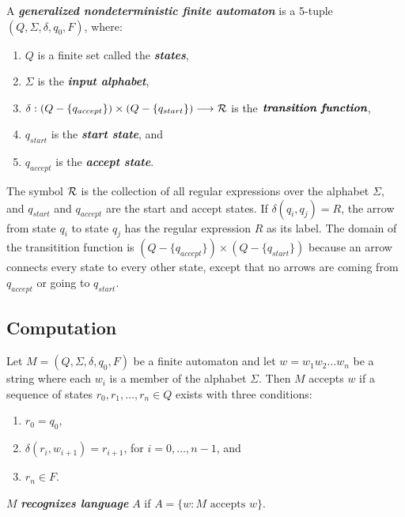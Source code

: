 \documentclass[12pt]{article}
\begin{document}
\begin{definition}
  A \textit{\textbf{generalized nondeterministic finite automaton}} is a
  5-tuple $(Q,\Sigma,\delta,q_0,F)$, where:
  \begin{enumerate}
  \item $Q$ is a finite set called the \textit{\textbf{states}},
  \item $\Sigma$ is the \textit{\textbf{input alphabet}},
  \item $\delta : (Q-\{q_{accept}\}) \times (Q-\{q_{start}\}) \longrightarrow
    \mathcal{R}$ is the $\textit{\textbf{transition function}}$,
  \item $q_{start}$ is the \textit{\textbf{start state}}, and
  \item $q_{accept}$ is the \textit{\textbf{accept state}}.
  \end{enumerate}
  The symbol $\mathcal{R}$ is the collection of all regular expressions over the
  alphabet $\Sigma$, and $q_{start}$ and $q_{accept}$ are the start and
  accept states. If $\delta(q_i,q_j)=R$, the arrow from state $q_i$ to state
  $q_j$ has the regular expression $R$ as its label. The domain of the
  transitition function is $(Q-\{q_{accept}\})\times(Q-\{q_{start}\})$
  because an arrow connects every state to every other state, except that no
  arrows are coming from $q_{accept}$ or going to $q_{start}$.
\end{definition}

\subsection{Computation}
\label{sec:orgf13c091}
\begin{definition}[Computation]
  Let $M=(Q,\Sigma,\delta,q_0,F)$ be a finite automaton and let $w=w_1w_2\dots
  w_n$ be a string where each $w_i$ is a member of the alphabet $\Sigma$. Then
  $M$ accepts $w$ if a sequence of states $r_0,r_1,\dots,r_n\in Q$ exists with
  three conditions:
  \begin{enumerate}
  \item $r_{0}=q_{0}$,
  \item $\delta(r_i,w_{i+1})=r_{i+1}$, for $i=0,\dots,n-1$, and
  \item $r_n\in F$.
  \end{enumerate}
\end{definition}

\begin{definition}[recognizes]
  $M$ \textit{\textbf{recognizes language}} $A$ if $A=\{w : M \text{ accepts }
  w\}$.
\end{definition}
\end{document}
